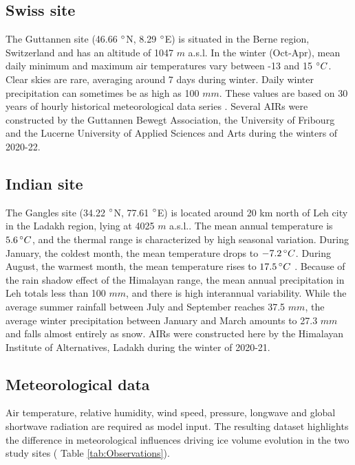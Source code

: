 \subsection{Swiss site}

The Guttannen site (46.66 $^{\circ}$N, 8.29 $^{\circ}$E) is situated in the Berne region, Switzerland and has an
altitude of 1047 $m$ a.s.l. In the winter (Oct-Apr), mean daily minimum and maximum air temperatures vary
between -13 and 15 $^{\circ} C$. Clear skies are rare, averaging around 7 days during winter. Daily winter
precipitation can sometimes be as high as 100 $mm$. These values are based on 30 years of hourly historical
meteorological data series \citep{meteoblueClimateGuttannen2021}. Several \ac{AIRs} were constructed by the Guttannen
Bewegt Association, the University of Fribourg and the Lucerne University of Applied Sciences and Arts during
the winters of 2020-22.

\subsection{Indian site}

The Gangles site (34.22 $^{\circ}$N, 77.61 $^{\circ}$E) is located around 20 km north of Leh city in the Ladakh
region, lying at 4025 $m$ a.s.l.. The mean annual temperature is $5.6 \, ^{\circ} C$, and the thermal range is
characterized by high seasonal variation. During January, the coldest month, the mean temperature drops to $-7.2
	\, ^{\circ} C$. During August, the warmest month, the mean temperature rises to $17.5 \, ^{\circ} C$
\citep{nusserIrrigationDevelopmentUpper2012}. Because of the rain shadow effect of the Himalayan range, the mean
annual precipitation in Leh totals less than 100 $mm$, and there is high interannual variability. While the
average summer rainfall between July and September reaches 37.5 $mm$, the average winter precipitation between
January and March amounts to 27.3 $ mm$ and falls almost entirely as snow. \ac{AIRs} were constructed here by the
Himalayan Institute of Alternatives, Ladakh during the winter of 2020-21.

\subsection{Meteorological data}

Air temperature, relative humidity, wind speed, pressure, longwave and global shortwave radiation are required
as model input.  The resulting dataset highlights the difference in
meteorological influences driving ice volume evolution in the two study sites ( Table
\ref{tab:Observations}).

